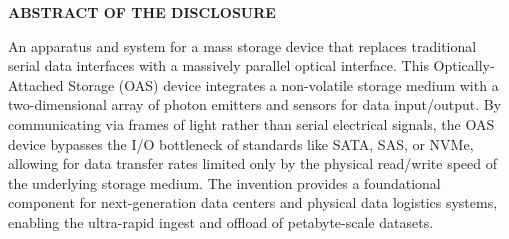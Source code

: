 \documentclass[11pt,letterpaper]{article}
\begin{document}
\thispagestyle{empty}

\begin{center}
    \textbf{\large ABSTRACT OF THE DISCLOSURE}
\end{center}

\vspace{0.6cm}

An apparatus and system for a mass storage device that replaces traditional serial data interfaces with a massively parallel optical interface. This Optically-Attached Storage (OAS) device integrates a non-volatile storage medium with a two-dimensional array of photon emitters and sensors for data input/output. By communicating via frames of light rather than serial electrical signals, the OAS device bypasses the I/O bottleneck of standards like SATA, SAS, or NVMe, allowing for data transfer rates limited only by the physical read/write speed of the underlying storage medium. The invention provides a foundational component for next-generation data centers and physical data logistics systems, enabling the ultra-rapid ingest and offload of petabyte-scale datasets.
\end{document}
